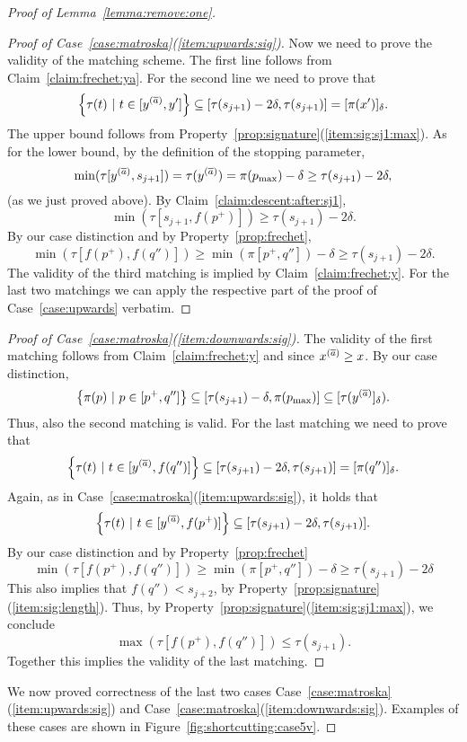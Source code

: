\documentclass[11pt, letter]{article}
\newcommand{\lemref}[1]{Lemma~\ref{lemma:#1}}
\newcommand{\figref}[1]{Figure~\ref{fig:#1}}
\newcommand{\caseref}[1]{Case~\ref{case:#1}}
\newcommand{\claimref}[1]{Claim~\ref{claim:#1}}
\newcommand{\propref}[1]{Property~\ref{prop:#1}}
\providecommand{\brc}[1]{\left\{ {#1} \right\}}
\newcommand{\setSubC}[4]{\ensuremath{\brc{ #1(#2) ~|~ #2 \in [#3,#4]} }}
\newcommand{\range}[2]{\ensuremath{[#1]_{#2}}}
\newcommand{\minSubC}[4]{\ensuremath{\min( #1[#3,#4])}}
\newcommand{\maxSubC}[4]{\ensuremath{\max( #1[#3,#4])}}
\begin{document}
\begin{proof}[Proof of \lemref{remove:one}]
\begin{proof}[Proof of \caseref{matroska}(\ref{item:upwards:sig})]
Now we need to prove the validity of the matching scheme.
The first line follows from \claimref{frechet:ya}.
For the second line we need to prove that
\[\setSubC{\tau}{t}{y^{(\Astop)}}{y'} \subseteq [\tau(s_{j+1})-2\delta,
\tau(s_{j+1})] = \range{\pi(x')}{\delta}.\]
The upper bound follows from \propref{signature}(\ref{item:sig:sj1:max}).
As for the lower bound, by the definition of the stopping parameter,
\[ \minSubC{\tau}{t}{y^{(\Astop)}}{s_{j+1}} = \tau(y^{(\Astop)})=
\pi(p_{\max})-\delta \geq \tau(s_{j+1})-2\delta, \]
(as we just proved above).
By \claimref{descent:after:sj1}, 
\[ \minSubC{\tau}{t}{s_{j+1}}{f(p^{+})} \geq \tau(s_{j+1})-2\delta.\]
By our case distinction and by \propref{frechet},
\[\minSubC{\tau}{t}{f(p^{+})}{f(q'')} \geq \minSubC{\pi}{p}{p^{+}}{q''}-\delta \geq
\tau(s_{j+1})-2\delta. \]
The validity of the third matching is implied by \claimref{frechet:y}.
For the last two matchings we can apply the respective part of the proof of
\caseref{upwards} verbatim.
\end{proof}

\begin{proof}[Proof of \caseref{matroska}(\ref{item:downwards:sig})]
The validity of the first matching follows from \claimref{frechet:y} and
since $x^{(\overline{a})} \geq x$.
By our case distinction,
\[ \setSubC{\pi}{p}{p^{+}}{q''} \subseteq 
[\tau(s_{j+1})-\delta, \pi(p_{\max})] \subseteq \range{\tau(y^{(\Astop)}}{\delta}).\]
Thus, also the second matching is valid.
For the last matching we need to prove that
\[\setSubC{\tau}{t}{y^{(\Astop)}}{f(q'')} \subseteq [\tau(s_{j+1})-2\delta,
\tau(s_{j+1})] = \range{\pi(q'')}{\delta}.\]
Again, as in \caseref{matroska}(\ref{item:upwards:sig}), it holds that 
\[\setSubC{\tau}{t}{y^{(\Astop)}}{f(p^{+})} \subseteq [\tau(s_{j+1})-2\delta,
\tau(s_{j+1})].\]
By our case distinction and by \propref{frechet} 
\[ \minSubC{\tau}{t}{f(p^{+})}{f(q'')} \geq 
\minSubC{\pi}{p}{p^{+}}{q''} -\delta \geq 
\tau(s_{j+1})-2\delta\]
This also implies that $f(q'') < s_{j+2}$, by
\propref{signature}(\ref{item:sig:length}). 
Thus, by \propref{signature}(\ref{item:sig:sj1:max}), we conclude
\[\maxSubC{\tau}{t}{f(p^{+})}{f(q'')} \leq \tau(s_{j+1}).\]
Together this implies the validity of the last matching.
\end{proof}

We now proved correctness of the last two cases
\caseref{matroska}(\ref{item:upwards:sig}) and
\caseref{matroska}(\ref{item:downwards:sig}).  Examples of these cases are shown
in \figref{shortcutting:case5v}.


\end{proof}
\end{document}
